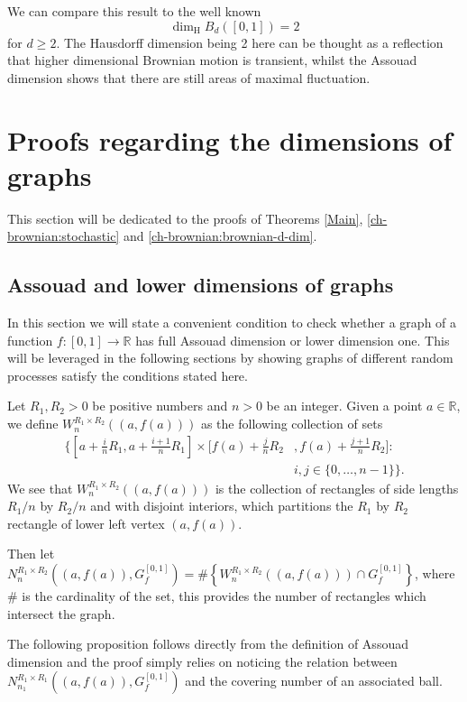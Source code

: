 We can compare this result to the well known \[\dim_{\mathrm{H}} B_d([0,1])=2\] for $d\geq 2$. The Hausdorff dimension being 2 here can be thought as a reflection that higher dimensional Brownian motion is transient, whilst the Assouad dimension shows that there are still areas of maximal fluctuation. 



\section{Proofs regarding the dimensions of graphs}

This section will be dedicated to the proofs of Theorems \ref{Main}, \ref{ch-brownian:stochastic} and \ref{ch-brownian:brownian-d-dim}.

\subsection{Assouad and lower dimensions of graphs}\label{ch:brownian:graph-proof}
In this section we will state a convenient condition to check whether a graph of a function $f:[0,1]\to\mathbb{R}$ has full Assouad dimension or lower dimension one. This will be leveraged in the following sections by showing graphs of different random processes satisfy the conditions stated here.


Let $R_1,R_2>0$ be positive numbers and $n>0$ be an integer. Given a point $a\in\mathbb{R}$, we define $W_{n}^{R_1\times R_2}((a, f(a)))$ as the following collection of sets
\begin{align*}
	\Bigg\{\left[a+\frac{i}{n}R_{1}, a+\frac{i+1}{n}R_{1}\right]\times \bigg[f(a)+\frac{j}{n}R_{2}&,f(a)+\frac{j+1}{n}R_{2}\bigg] \colon \\
	    & i,j\in\{0,\dots,n-1\}\Bigg\}.
\end{align*}
We see that $W_{n}^{R_1\times R_2}((a,f(a)))$ is the collection of rectangles of side lengths $R_1/n$ by $R_2/n$ and with disjoint interiors, which partitions the $R_1$ by $R_2$ rectangle of lower left vertex $(a,f(a))$.
	
Then let $N_{n}^{R_1 \times R_2 }((a,f(a)),G_f^{[0,1]})= \# \left\{ W_{n}^{R_1\times R_2}((a,f(a))) \cap G_f^{[0,1]} \right\}$, where $\#$ is the cardinality of the set, this provides the number of rectangles which intersect the graph.


The following proposition follows directly from the definition of Assouad dimension and the proof simply relies on noticing the relation between $N_{n_1}^{R_1 \times R_1 }((a,f(a)),G_f^{[0,1]})$ and the covering number of an associated ball.


